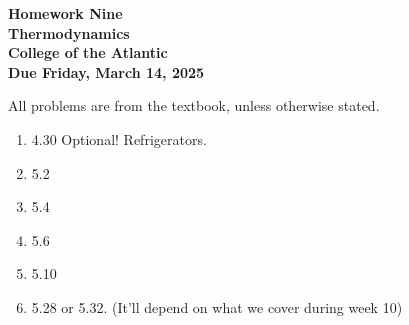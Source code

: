 \documentclass[12pt]{article}
\begin{document}
\pagestyle{empty}
 
\begin{center}
{\LARGE {\bf Homework Nine}}\\
\medskip
{\Large {\bf Thermodynamics}}\\
\medskip
{\Large {\bf College of the Atlantic}}\\
\medskip
{ {\bf Due Friday, March 14, 2025}}\\  
\end{center}
\medskip


\noindent All problems are from the textbook, unless otherwise stated. 


\begin{enumerate}
  \setlength{\itemsep}{4mm}

\item 4.30 Optional! Refrigerators.
\item 5.2
\item 5.4
\item 5.6
\item 5.10
\item 5.28 or 5.32. (It'll depend on what we cover during week 10)
   
\end{enumerate}
\end{document}

